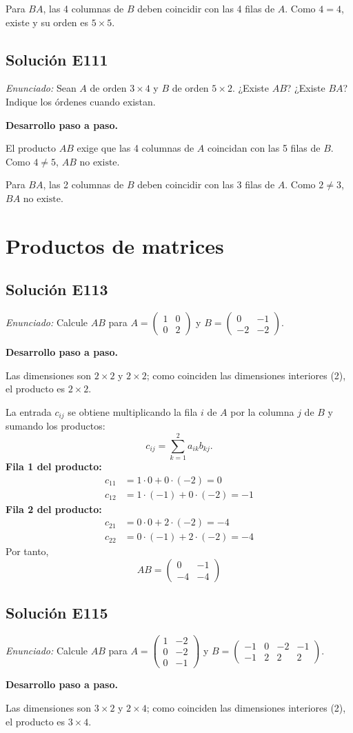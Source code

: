 \documentclass[12pt]{article}
\theoremstyle{remark}
\newcommand{\solucion}[2]{\Needspace{11\baselineskip}\subsection*{Solución E#1}\noindent\textit{Enunciado:} #2\par\medskip\noindent\textbf{Desarrollo paso a paso.}\par\medskip}
\begin{document}
Para $BA$, las 4 columnas de $B$ deben coincidir con las 4 filas de $A$. Como $4=4$, existe y su orden es $\boxed{5\times 5}$.


\medskip

\solucion{111}{Sean $A$ de orden $3\times4$ y $B$ de orden $5\times2$. ¿Existe $AB$? ¿Existe $BA$? Indique los órdenes cuando existan.}
El producto $AB$ exige que las 4 columnas de $A$ coincidan con las 5 filas de $B$. Como $4\neq5$, $\boxed{AB\text{ no existe}}$.

Para $BA$, las 2 columnas de $B$ deben coincidir con las 3 filas de $A$. Como $2\neq3$, $\boxed{BA\text{ no existe}}$.


\medskip

\section{Productos de matrices}

\solucion{113}{Calcule $AB$ para $A=\begin{pmatrix}1&0\\0&2\end{pmatrix}$ y $B=\begin{pmatrix}0&-1\\-2&-2\end{pmatrix}$.}
Las dimensiones son $2\times2$ y $2\times2$; como coinciden las dimensiones interiores (2), el producto es $2\times2$.

La entrada $c_{ij}$ se obtiene multiplicando la fila $i$ de $A$ por la columna $j$ de $B$ y sumando los productos:
\[
c_{ij}=\sum_{k=1}^{2} a_{ik}b_{kj}.
\]
\textbf{Fila 1 del producto:}
\[
\begin{aligned}c_{11}&=1\cdot 0+0\cdot (-2)=0\\c_{12}&=1\cdot (-1)+0\cdot (-2)=-1\end{aligned}
\]
\textbf{Fila 2 del producto:}
\[
\begin{aligned}c_{21}&=0\cdot 0+2\cdot (-2)=-4\\c_{22}&=0\cdot (-1)+2\cdot (-2)=-4\end{aligned}
\]
Por tanto,
\[
\boxed{AB=\begin{pmatrix}0&-1\\-4&-4\end{pmatrix}}
\]

\medskip

\solucion{115}{Calcule $AB$ para $A=\begin{pmatrix}1&-2\\0&-2\\0&-1\end{pmatrix}$ y $B=\begin{pmatrix}-1&0&-2&-1\\-1&2&2&2\end{pmatrix}$.}
Las dimensiones son $3\times2$ y $2\times4$; como coinciden las dimensiones interiores (2), el producto es $3\times4$.
\end{document}
